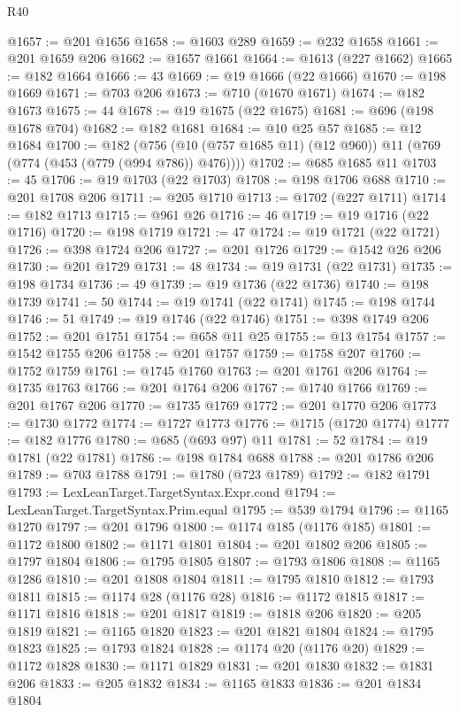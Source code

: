 \begin{lexlean}{R40}
\begin{coremodule}
@1657 := @201 @1656
@1658 := @1603 @289
@1659 := @232 @1658
@1661 := @201 @1659 @206
@1662 := @1657 @1661
@1664 := @1613 (@227 @1662)
@1665 := @182 @1664
@1666 := 43
@1669 := @19 @1666 (@22 @1666)
@1670 := @198 @1669
@1671 := @703 @206
@1673 := @710 (@1670 @1671)
@1674 := @182 @1673
@1675 := 44
@1678 := @19 @1675 (@22 @1675)
@1681 := @696 (@198 @1678 @704)
@1682 := @182 @1681
@1684 := @10 @25 @57
@1685 := @12 @1684
@1700 := @182
    (@756 (@10 (@757 @1685 @11) (@12 @960)) @11 (@769 (@774 (@453 (@779 (@994 @786)) @476))))
@1702 := @685 @1685 @11
@1703 := 45
@1706 := @19 @1703 (@22 @1703)
@1708 := @198 @1706 @688
@1710 := @201 @1708 @206
@1711 := @205 @1710
@1713 := @1702 (@227 @1711)
@1714 := @182 @1713
@1715 := @961 @26
@1716 := 46
@1719 := @19 @1716 (@22 @1716)
@1720 := @198 @1719
@1721 := 47
@1724 := @19 @1721 (@22 @1721)
@1726 := @398 @1724 @206
@1727 := @201 @1726
@1729 := @1542 @26 @206
@1730 := @201 @1729
@1731 := 48
@1734 := @19 @1731 (@22 @1731)
@1735 := @198 @1734
@1736 := 49
@1739 := @19 @1736 (@22 @1736)
@1740 := @198 @1739
@1741 := 50
@1744 := @19 @1741 (@22 @1741)
@1745 := @198 @1744
@1746 := 51
@1749 := @19 @1746 (@22 @1746)
@1751 := @398 @1749 @206
@1752 := @201 @1751
@1754 := @658 @11 @25
@1755 := @13 @1754
@1757 := @1542 @1755 @206
@1758 := @201 @1757
@1759 := @1758 @207
@1760 := @1752 @1759
@1761 := @1745 @1760
@1763 := @201 @1761 @206
@1764 := @1735 @1763
@1766 := @201 @1764 @206
@1767 := @1740 @1766
@1769 := @201 @1767 @206
@1770 := @1735 @1769
@1772 := @201 @1770 @206
@1773 := @1730 @1772
@1774 := @1727 @1773
@1776 := @1715 (@1720 @1774)
@1777 := @182 @1776
@1780 := @685 (@693 @97) @11
@1781 := 52
@1784 := @19 @1781 (@22 @1781)
@1786 := @198 @1784 @688
@1788 := @201 @1786 @206
@1789 := @703 @1788
@1791 := @1780 (@723 @1789)
@1792 := @182 @1791
@1793 := LexLeanTarget.TargetSyntax.Expr.cond
@1794 := LexLeanTarget.TargetSyntax.Prim.equal
@1795 := @539 @1794
@1796 := @1165 @1270
@1797 := @201 @1796
@1800 := @1174 @185 (@1176 @185)
@1801 := @1172 @1800
@1802 := @1171 @1801
@1804 := @201 @1802 @206
@1805 := @1797 @1804
@1806 := @1795 @1805
@1807 := @1793 @1806
@1808 := @1165 @1286
@1810 := @201 @1808 @1804
@1811 := @1795 @1810
@1812 := @1793 @1811
@1815 := @1174 @28 (@1176 @28)
@1816 := @1172 @1815
@1817 := @1171 @1816
@1818 := @201 @1817
@1819 := @1818 @206
@1820 := @205 @1819
@1821 := @1165 @1820
@1823 := @201 @1821 @1804
@1824 := @1795 @1823
@1825 := @1793 @1824
@1828 := @1174 @20 (@1176 @20)
@1829 := @1172 @1828
@1830 := @1171 @1829
@1831 := @201 @1830
@1832 := @1831 @206
@1833 := @205 @1832
@1834 := @1165 @1833
@1836 := @201 @1834 @1804

\end{coremodule}
\end{lexlean}
